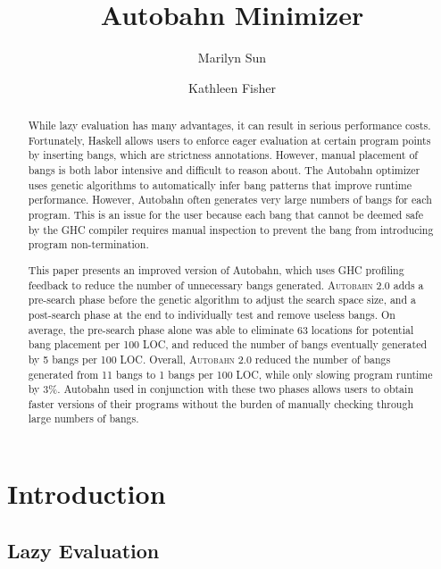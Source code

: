 \documentclass[format=sigplan, review=true]{acmart}
\newcommand{\At}[0]{\textsc{Autobahn 2.0}}
\newcommand{\preopt}[0]{pre-search}
\newcommand{\postopt}[0]{post-search}
\begin{document}
\title{Autobahn Minimizer}
\author{Marilyn Sun}
\author{Kathleen Fisher}
\begin{abstract}
	While lazy evaluation has many advantages, it can result in serious performance costs. Fortunately, Haskell allows users to enforce eager evaluation at certain program points by inserting bangs, which are strictness annotations. However, manual placement of bangs is both labor intensive and difficult to reason about. The Autobahn optimizer uses genetic algorithms to automatically infer bang patterns that improve runtime performance. However, Autobahn often generates very large numbers of bangs for each program. This is an issue for the user because each bang that cannot be deemed safe by the GHC compiler requires manual inspection to prevent the bang from introducing program non-termination.

This paper presents an improved version of Autobahn, which uses GHC profiling feedback to reduce the number of unnecessary bangs generated. \At{} adds a \preopt{} phase before the genetic algorithm to adjust the search space size, and a \postopt{} phase at the end to individually test and remove useless bangs. On average, the \preopt{} phase alone was able to eliminate 63 locations for potential bang placement per 100 LOC, and reduced the number of bangs eventually generated by 5 bangs per 100 LOC. Overall, \At{} reduced the number of bangs generated from 11 bangs to 1 bangs per 100 LOC, while only slowing program runtime by 3\%. Autobahn used in conjunction with these two phases allows users to obtain faster versions of their programs without the burden of manually checking through large numbers of bangs.
\end{abstract}
\maketitle

\section{Introduction}

\subsection{Lazy Evaluation}
\end{document}
